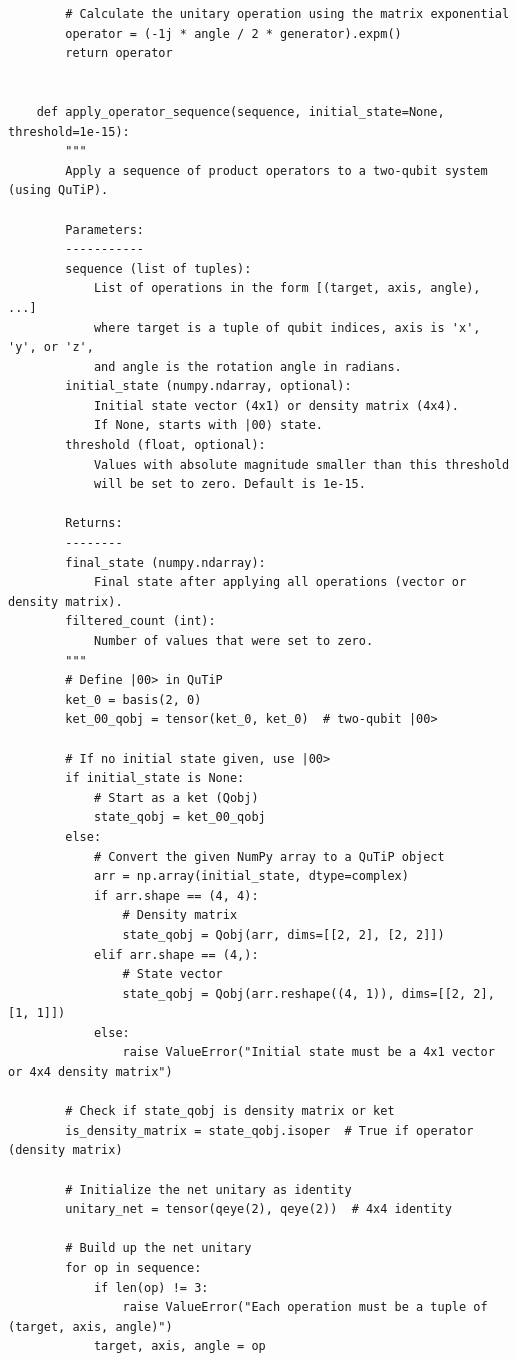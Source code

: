 \documentclass[11pt]{article}
\begin{document}
\begin{verbatim}
        # Calculate the unitary operation using the matrix exponential
        operator = (-1j * angle / 2 * generator).expm()
        return operator
    
    
    def apply_operator_sequence(sequence, initial_state=None, threshold=1e-15):
        """
        Apply a sequence of product operators to a two-qubit system (using QuTiP).
        
        Parameters:
        -----------
        sequence (list of tuples):
            List of operations in the form [(target, axis, angle), ...] 
            where target is a tuple of qubit indices, axis is 'x', 'y', or 'z', 
            and angle is the rotation angle in radians.
        initial_state (numpy.ndarray, optional):
            Initial state vector (4x1) or density matrix (4x4). 
            If None, starts with |00⟩ state.
        threshold (float, optional):
            Values with absolute magnitude smaller than this threshold 
            will be set to zero. Default is 1e-15.
        
        Returns:
        --------
        final_state (numpy.ndarray):
            Final state after applying all operations (vector or density matrix).
        filtered_count (int):
            Number of values that were set to zero.
        """
        # Define |00> in QuTiP
        ket_0 = basis(2, 0)
        ket_00_qobj = tensor(ket_0, ket_0)  # two-qubit |00>
        
        # If no initial state given, use |00>
        if initial_state is None:
            # Start as a ket (Qobj)
            state_qobj = ket_00_qobj
        else:
            # Convert the given NumPy array to a QuTiP object
            arr = np.array(initial_state, dtype=complex)
            if arr.shape == (4, 4):
                # Density matrix
                state_qobj = Qobj(arr, dims=[[2, 2], [2, 2]])
            elif arr.shape == (4,):
                # State vector
                state_qobj = Qobj(arr.reshape((4, 1)), dims=[[2, 2], [1, 1]])
            else:
                raise ValueError("Initial state must be a 4x1 vector or 4x4 density matrix")
        
        # Check if state_qobj is density matrix or ket
        is_density_matrix = state_qobj.isoper  # True if operator (density matrix)
        
        # Initialize the net unitary as identity
        unitary_net = tensor(qeye(2), qeye(2))  # 4x4 identity
        
        # Build up the net unitary
        for op in sequence:
            if len(op) != 3:
                raise ValueError("Each operation must be a tuple of (target, axis, angle)")
            target, axis, angle = op
            

\end{verbatim}
\end{document}
